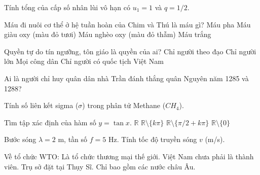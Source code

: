 \begin{ex}
    Tính tổng của cấp số nhân lùi vô hạn có $u_1 = 1$ và $q = 1/2$.
\end{ex}

\begin{ex}
    Máu đi nuôi cơ thể ở hệ tuần hoàn của Chim và Thú là máu gì?
    \choice
    {Máu pha}
    {\True Máu giàu oxy (màu đỏ tươi)}
    {Máu nghèo oxy (màu đỏ thẫm)}
    {Máu trắng}
\end{ex}

\begin{ex}
    Quyền tự do tín ngưỡng, tôn giáo là quyền của ai?
    \choice
    {Chỉ người theo đạo}
    {Chỉ người lớn}
    {\True Mọi công dân}
    {Chỉ người có quốc tịch Việt Nam}
\end{ex}

\begin{ex}
    Ai là người chỉ huy quân dân nhà Trần đánh thắng quân Nguyên năm 1285 và 1288?

\end{ex}

\begin{ex}
    Tính số liên kết sigma ($\sigma$) trong phân tử Methane ($CH_4$).
\end{ex}

\begin{ex}
    Tìm tập xác định của hàm số $y = \tan x$.
    \choice
    {$\mathbb{R}$}
    {$\mathbb{R} \setminus \{k\pi\}$}
    {\True $\mathbb{R} \setminus \{\pi/2 + k\pi\}$}
    {$\mathbb{R} \setminus \{0\}$}
\end{ex}

\begin{ex}
    Bước sóng $\lambda = 2$ m, tần số $f = 5$ Hz. Tính tốc độ truyền sóng $v$ (m/s).
\end{ex}

\begin{ex}
    Về tổ chức WTO:
    \choiceTF
    {\True Là tổ chức thương mại thế giới.}
    {Việt Nam chưa phải là thành viên.}
    {\True Trụ sở đặt tại Thụy Sĩ.}
    {Chỉ bao gồm các nước châu Âu.}
\end{ex}

